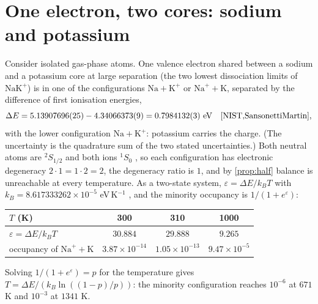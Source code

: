 \documentclass[11pt]{article}
\theoremstyle{definition}\newtheorem{definition}[theorem]{Definition}
\theoremstyle{remark}\newtheorem{remark}[theorem]{Remark}
\begin{document}
\section{One electron, two cores: sodium and potassium}\label{sec:nak}
Consider isolated gas-phase atoms. One valence electron shared between a sodium and a potassium core at large separation (the two lowest dissociation limits of $\mathrm{NaK^+}$) is in one of the configurations $\mathrm{Na}+\mathrm K^+$ or $\mathrm{Na}^++\mathrm K$, separated by the difference of first ionisation energies,
\[
\Delta E=5.13907696(25)-4.34066373(9)=0.7984132(3)\ \text{eV}\quad\text{\cite{NIST,SansonettiMartin}},
\]
with the lower configuration $\mathrm{Na}+\mathrm K^+$: potassium carries the charge. (The uncertainty is the quadrature sum of the two stated uncertainties.) Both neutral atoms are ${}^2S_{1/2}$ and both ions ${}^1S_0$ \cite{SansonettiMartin}, so each configuration has electronic degeneracy $2\cdot1=1\cdot2=2$, the degeneracy ratio is $1$, and by \cref{prop:half} balance is unreachable at every temperature. As a two-state system, $\varepsilon=\Delta E/k_BT$ with $k_B=8.617333262\times10^{-5}$ eV\,K$^{-1}$ \cite{CODATA}, and the minority occupancy is $1/(1+e^{\varepsilon})$:
\begin{center}\small
\begin{tabular}{@{}lccc@{}}\toprule
$T$ (K) & 300 & 310 & 1000\\\midrule
$\varepsilon=\Delta E/k_BT$ & $30.884$ & $29.888$ & $9.265$\\
occupancy of $\mathrm{Na}^++\mathrm K$ & $3.87\times10^{-14}$ & $1.05\times10^{-13}$ & $9.47\times10^{-5}$\\\bottomrule
\end{tabular}
\end{center}
Solving $1/(1+e^{\varepsilon})=p$ for the temperature gives $T=\Delta E/(k_B\ln((1-p)/p))$: the minority configuration reaches $10^{-6}$ at $671$ K and $10^{-3}$ at $1341$ K.
\end{document}
